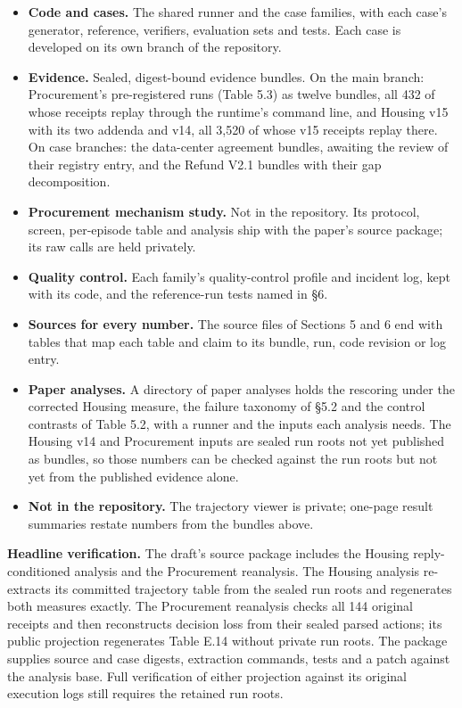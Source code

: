 \begin{itemize}
\tightlist
\item
  \textbf{Code and cases.} The shared runner and the case families, with each case's generator, reference, verifiers,
  evaluation sets and tests. Each case is developed on its own branch of the repository.
\item
  \textbf{Evidence.} Sealed, digest-bound evidence bundles. On the main branch: Procurement's pre-registered runs (Table
  5.3) as twelve bundles, all 432 of whose receipts replay through the runtime's command line, and Housing v15 with
  its two addenda and v14, all 3,520 of whose v15 receipts replay there. On case branches: the data-center agreement
  bundles, awaiting the review of their registry entry, and the Refund V2.1 bundles with their gap decomposition.
\item
  \textbf{Procurement mechanism study.} Not in the repository. Its protocol, screen, per-episode table and analysis ship
  with the paper's source package; its raw calls are held privately.
\item
  \textbf{Quality control.} Each family's quality-control profile and incident log, kept with its code, and the
  reference-run tests named in §6.
\item
  \textbf{Sources for every number.} The source files of Sections 5 and 6 end with tables that map each table and claim to
  its bundle, run, code revision or log entry.
\item
  \textbf{Paper analyses.} A directory of paper analyses holds the rescoring under the corrected Housing measure, the
  failure taxonomy of §5.2 and the control contrasts of Table 5.2, with a runner and the inputs each analysis needs.
  The Housing v14 and Procurement inputs are sealed run roots not yet published as bundles, so those numbers can be
  checked against the run roots but not yet from the published evidence alone.
\item
  \textbf{Not in the repository.} The trajectory viewer is private; one-page result summaries restate numbers from the
  bundles above.
\end{itemize}

\textbf{Headline verification.} The draft's source package includes the Housing reply-conditioned analysis and the
Procurement reanalysis. The Housing analysis re-extracts its committed trajectory table from the sealed run roots and
regenerates both measures exactly. The Procurement reanalysis checks all 144 original receipts and then reconstructs
decision loss from their sealed parsed actions; its public projection regenerates Table E.14 without private run
roots. The package supplies source and case digests, extraction commands, tests and a patch against the analysis base.
Full verification of either projection against its original execution logs still requires the retained run roots.

